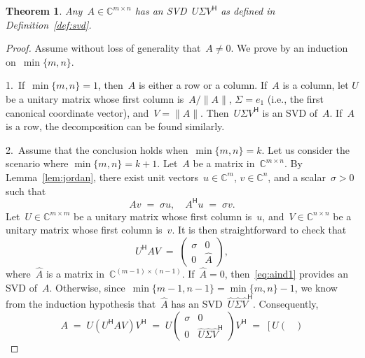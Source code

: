\documentclass[11pt,a4paper]{article}  %
\numberwithin{equation}{section}
\newtheorem{theorem}{Theorem}%
\theoremstyle{definition}
\def\CC{\mathbb{C}}
\newcommand{\hmt}{{\scriptscriptstyle{{\mathsf{H}}}}}
\newcommand{\ie}{{i.e.}}
\begin{document}
\begin{theorem}
  \label{th:svd}
  Any~$A\in\CC^{m\times n}$ has an SVD~$U\Sigma V^\hmt$
  as defined in Definition~\ref{def:svd}.
\end{theorem}

\begin{proof}
  Assume without loss of generality that~$A\neq 0$. We prove by an induction on~$\min\{m,n\}$.

  1.~If~$\min\{m, n\} = 1$, then~$A$ is either a row or a column. If~$A$ is a column, let
  $U$ be a unitary matrix whose first column is~$A/\|A\|$, $\Sigma = e_1$ (\ie, the first canonical
  coordinate vector), and~$V = \|A\|$. Then~$U\Sigma V^\hmt$ is an SVD
  of~$A$. If~$A$ is a row, the decomposition can be found similarly.

  2.~Assume that the conclusion holds when~$\min\{m,n\}= k$. Let us consider the scenario where
  $\min\{m,n\} = k+1$. Let~$A$ be a matrix in~$\CC^{m\times n}$.
  By Lemma~\ref{lem:jordan},
  there exist unit vectors~$u\in\CC^{m}$, $v\in\CC^{n}$, and a scalar~$\sigma>0$ such that
  \begin{equation}
    \label{eq:jordan}
    Av \;=\; \sigma u, \quad A^\hmt u\;=\;\sigma v.
  \end{equation}
  Let~$U\in \CC^{m\times m}$ be a unitary matrix whose first column is~$u$, and~$V\in\CC^{n\times n}$
  be a unitary matrix whose first column is~$v$. It is then straightforward to check that
  \begin{equation}
    \label{eq:aind1}
    U^\hmt A V \;=\;
    \begin{pmatrix}
      \sigma & 0\\
      0 & \hat{A}
    \end{pmatrix},
  \end{equation}
  where~$\hat{A}$ is a matrix in~$\CC^{(m-1)\times (n-1)}$. If~$\hat{A} = 0$, then~\eqref{eq:aind1}
  provides an SVD of~$A$.
  Otherwise, since~$\min\{m-1, n-1\} = \min\{m,n\}-1$, we
  know from the induction hypothesis that~$\hat{A}$ has an SVD~$\hat{U}\hat{\Sigma} \hat{V}^\hmt$.
  Consequently,
  \begin{equation}
    \label{eq:aind2}
    A \;=\; U (U^\hmt A V)V^\hmt
    \;=\;
    U
    \begin{pmatrix}
    \sigma & 0\\
    0 & \hat{U}\hat{\Sigma} \hat{V}^\hmt
    \end{pmatrix}
    V^\hmt
  \;=\;
    \left[
  U
  \begin{pmatrix}

\end{pmatrix}
\end{equation}
\end{proof}
\end{document}
